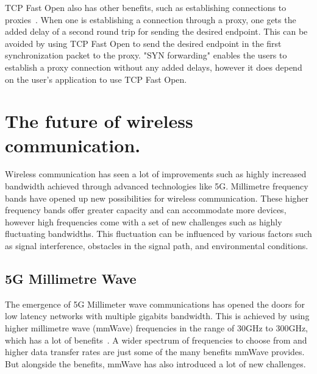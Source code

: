 \documentclass[a4paper,english, 11pt]{report}
\begin{document}
TCP Fast Open also has other benefits, such as establishing connections to proxies~\cite{rfc8803}. When one is establishing a connection through a proxy, one gets the added delay of a second round trip for sending the desired endpoint. This can be avoided by using TCP Fast Open to send the desired endpoint in the first synchronization packet to the proxy. "SYN forwarding" enables the users to establish a proxy connection without any added delays, however it does depend on the user's application to use TCP Fast Open.

\section{The future of wireless communication.}
Wireless communication has seen a lot of improvements such as highly increased bandwidth achieved through advanced technologies like 5G. Millimetre frequency bands have opened up new possibilities for wireless communication. These higher frequency bands offer greater capacity and can accommodate more devices, however high frequencies come with a set of new challenges such as highly fluctuating bandwidths. This fluctuation can be influenced by various factors such as signal interference, obstacles in the signal path, and environmental conditions.

\subsection{5G Millimetre Wave}
The emergence of 5G Millimeter wave communications has opened the doors for low latency networks with multiple gigabits bandwidth. This is achieved by using higher millimetre wave (mmWave) frequencies in the range of 30GHz to 300GHz, which has a lot of benefits~\cite{Agrawal_Sharma_2016}. A wider spectrum of frequencies to choose from and higher data transfer rates are just some of the many benefits mmWave provides. But alongside the benefits, mmWave has also introduced a lot of new challenges.\\
\end{document}
